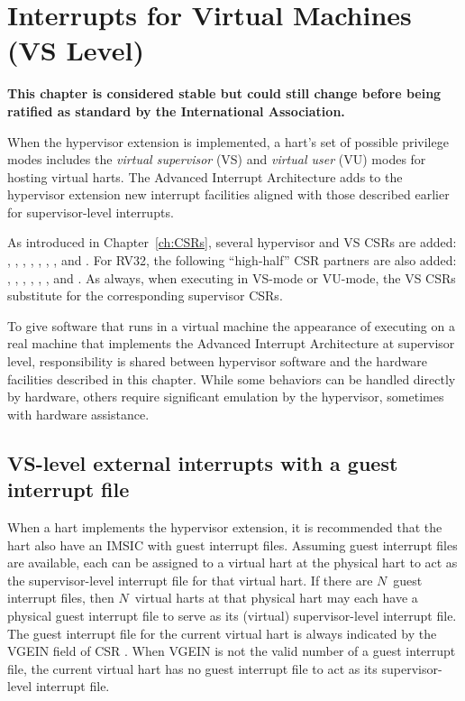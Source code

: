 
\chapter{Interrupts for Virtual Machines (VS Level)}
\label{ch:VSLevel}

\textbf{%
This chapter is considered stable but could still change before being
ratified as standard by the {\RISCV} International Association.%
}
\bigskip

When the hypervisor extension is implemented, a hart's set of possible
privilege modes includes the \emph{virtual supervisor} (VS) and
\emph{virtual user} (VU) modes for hosting virtual harts.
The Advanced Interrupt Architecture adds to the hypervisor extension
new interrupt facilities aligned with those described earlier for
supervisor-level interrupts.

As introduced in Chapter~\ref{ch:CSRs}, several hypervisor and VS CSRs
are added:  , , , ,
, , , and .
For RV32, the following ``high-half'' CSR partners are also added:
, , , , ,
, and .
As always, when executing in \mbox{VS-mode} or \mbox{VU-mode}, the
VS CSRs substitute for the corresponding supervisor CSRs.

To give software that runs in a virtual machine the appearance of
executing on a real machine that implements the Advanced Interrupt
Architecture at supervisor level, responsibility is shared between
hypervisor software and the hardware facilities described in this
chapter.
While some behaviors can be handled directly by hardware, others
require significant emulation by the hypervisor, sometimes with
hardware assistance.

\section{VS-level external interrupts with a guest interrupt file}

When a hart implements the hypervisor extension, it is recommended that
the hart also have an IMSIC with guest interrupt files.
Assuming guest interrupt files are available, each can be assigned
to a virtual hart at the physical hart to act as the supervisor-level
interrupt file for that virtual hart.
If there are $N$~guest interrupt files, then $N$~virtual harts at that
physical hart may each have a physical guest interrupt file to serve as
its (virtual) supervisor-level interrupt file.
The guest interrupt file for the current virtual hart is always
indicated by the VGEIN field of CSR .
When VGEIN is not the valid number of a guest interrupt file, the
current virtual hart has no guest interrupt file to act as its
supervisor-level interrupt file.

